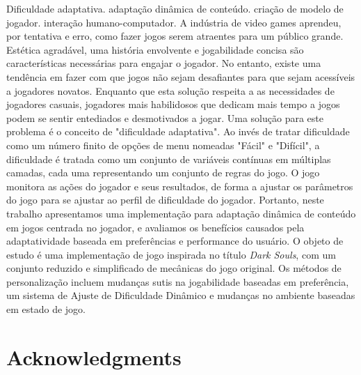\documentclass[cic,tc,english]{iiufrgs}
\begin{document}
\begin{englishabstract}{}{Dificuldade adaptativa. adaptação dinâmica de conteúdo. criação de modelo de jogador. interação humano-computador.}
    A indústria de video games aprendeu, por tentativa e erro, como fazer jogos serem atraentes para um público grande. Estética agradável, uma história envolvente e jogabilidade concisa são características necessárias para engajar o jogador. No entanto, existe uma tendência em fazer com que jogos não sejam desafiantes para que sejam acessíveis a jogadores novatos. Enquanto que esta solução respeita a as necessidades de jogadores casuais, jogadores mais habilidosos que dedicam mais tempo a jogos podem se sentir entediados e desmotivados a jogar. Uma solução para este problema é o conceito de "dificuldade adaptativa". Ao invés de tratar dificuldade como um número finito de opções de menu nomeadas "Fácil" e "Difícil", a dificuldade é tratada como um conjunto de variáveis contínuas em múltiplas camadas, cada uma representando um conjunto de regras do jogo. O jogo monitora as ações do jogador e seus resultados, de forma a ajustar os parâmetros do jogo para se ajustar ao perfil de dificuldade do jogador. Portanto, neste trabalho apresentamos uma implementação para adaptação dinâmica de conteúdo em jogos centrada no jogador, e avaliamos os benefícios causados pela adaptatividade baseada em preferências e performance do usuário. O objeto de estudo é uma implementação de jogo inspirada no título \emph{Dark Souls}, com um conjunto reduzido e simplificado de mecânicas do jogo original. Os métodos de personalização incluem mudanças sutis na jogabilidade baseadas em preferência, um sistema de Ajuste de Dificuldade Dinâmico e mudanças no ambiente baseadas em estado de jogo.
\end{englishabstract}

\chapter*{Acknowledgments}

\end{document}
